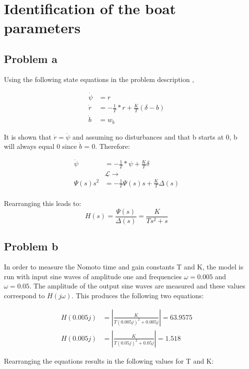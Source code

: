 \section{Identification of the boat parameters}
\subsection{Problem a}
Using the following state equations in the problem description ,

\begin{align*}
    \dot{\psi} &= r \\
    \dot{r} &= -\frac{1}{T}*r + \frac{K}{T}(\delta - b) \\
    \dot{b} &= w_b
\end{align*}

It is shown that $\dot{r} = \ddot{\psi}$ and assuming no disturbances and that b starts at 0, b will
always equal 0 since $\dot{b}$ = 0. Therefore:

\begin{align*}
    \ddot{\psi} &= -\frac{1}{T}*\psi + \frac{K}{T}\delta \\
    &\mathcal{L}\rightarrow  \\
    \Psi(s)s^2  &= -\frac{1}{T}\Psi(s)s + \frac{K}{T}\Delta(s) \\
\end{align*}

Rearranging this leads to:
\begin{equation}
    H(s) = \frac{\Psi(s)}{\Delta(s)} = \frac{K}{Ts^2 + s}
\end{equation}

\subsection{Problem b}
In order to measure the Nomoto time and gain constants T and K, the model is run with input sine waves
of amplitude one and frequencies $\omega = 0.005$ and $\omega = 0.05$. The amplitude of the output sine
waves are measured and these values correspond to $H(j\omega)$. This produces the following two
equations:

\begin{align*}
    H(0.005j) &= \left|\frac{K}{T(0.005j)^2 + 0.005j}\right| = 63.9575 \\
    H(0.005j) &= \left|\frac{K}{T(0.05j)^2 + 0.05j}\right| = 1.518
\end{align*}

Rearranging the equations results in the following values for T and K:

